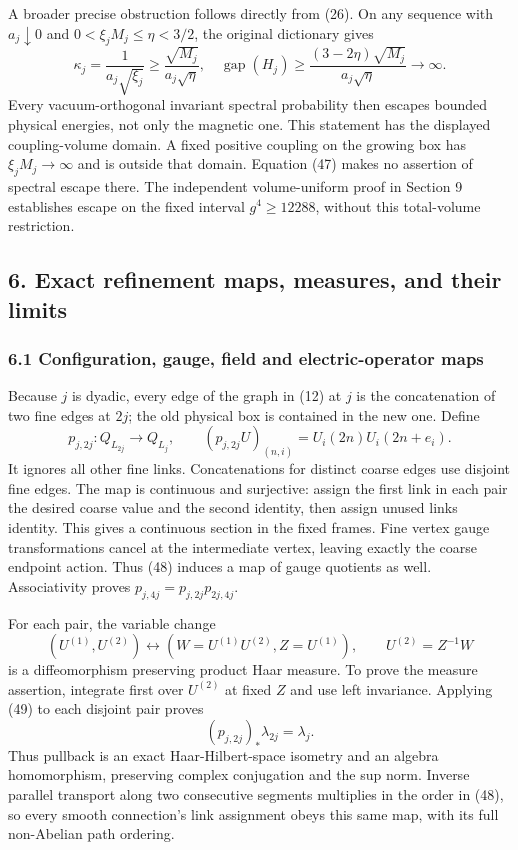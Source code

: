 \documentclass[
  11pt,
]{article}
\begin{document}
A broader precise obstruction follows directly from (26). On any
sequence with \(a_j\downarrow0\) and \(0<\xi_jM_j\le\eta<3/2\), the
original dictionary gives \[
 \kappa_j=\frac1{a_j\sqrt{\xi_j}}
 \ge\frac{\sqrt{M_j}}{a_j\sqrt\eta},
\quad \operatorname{gap}(H_j)\ge
 \frac{(3-2\eta)\sqrt{M_j}}{a_j\sqrt\eta}\longrightarrow\infty.
\tag{47}
\] Every vacuum-orthogonal invariant spectral probability then escapes
bounded physical energies, not only the magnetic one. This statement has
the displayed coupling-volume domain. A fixed positive coupling on the
growing box has \(\xi_jM_j\to\infty\) and is outside that domain.
Equation (47) makes no assertion of spectral escape there. The
independent volume-uniform proof in Section 9 establishes escape on the
fixed interval \(g^4\ge12288\), without this total-volume restriction.

\subsection{6. Exact refinement maps, measures, and their
limits}\label{exact-refinement-maps-measures-and-their-limits}

\subsubsection{6.1 Configuration, gauge, field and electric-operator
maps}\label{configuration-gauge-field-and-electric-operator-maps}

Because \(j\) is dyadic, every edge of the graph in (12) at \(j\) is the
concatenation of two fine edges at \(2j\); the old physical box is
contained in the new one. Define \[
 p_{j,2j}:Q_{L_{2j}}\longrightarrow Q_{L_j},\qquad
 (p_{j,2j}U)_{(n,i)}=U_i(2n)U_i(2n+e_i).
\tag{48}
\] It ignores all other fine links. Concatenations for distinct coarse
edges use disjoint fine edges. The map is continuous and surjective:
assign the first link in each pair the desired coarse value and the
second identity, then assign unused links identity. This gives a
continuous section in the fixed frames. Fine vertex gauge
transformations cancel at the intermediate vertex, leaving exactly the
coarse endpoint action. Thus (48) induces a map of gauge quotients as
well. Associativity proves \(p_{j,4j}=p_{j,2j}p_{2j,4j}\).

For each pair, the variable change \[
 (U^{(1)},U^{(2)})\longleftrightarrow
 (W=U^{(1)}U^{(2)},Z=U^{(1)}),\qquad
 U^{(2)}=Z^{-1}W
\tag{49}
\] is a diffeomorphism preserving product Haar measure. To prove the
measure assertion, integrate first over \(U^{(2)}\) at fixed \(Z\) and
use left invariance. Applying (49) to each disjoint pair proves \[
 (p_{j,2j})_*\lambda_{2j}=\lambda_j.
\tag{50}
\] Thus pullback is an exact Haar-Hilbert-space isometry and an algebra
homomorphism, preserving complex conjugation and the sup norm. Inverse
parallel transport along two consecutive segments multiplies in the
order in (48), so every smooth connection's link assignment obeys this
same map, with its full non-Abelian path ordering.
\end{document}
